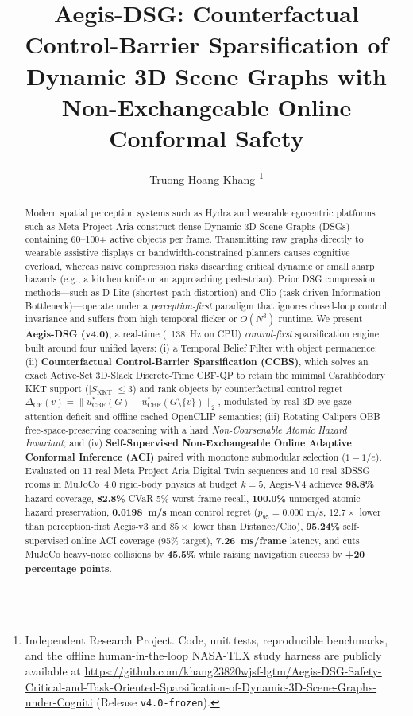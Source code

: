 \documentclass[journal]{IEEEtran}
\title{Aegis-DSG: Counterfactual Control-Barrier Sparsification of Dynamic 3D Scene Graphs with Non-Exchangeable Online Conformal Safety}
\author{Truong Hoang Khang%
\thanks{Independent Research Project. Code, unit tests, reproducible benchmarks, and the offline human-in-the-loop NASA-TLX study harness are publicly available at \url{https://github.com/khang23820wjsf-lgtm/Aegis-DSG-Safety-Critical-and-Task-Oriented-Sparsification-of-Dynamic-3D-Scene-Graphs-under-Cogniti} (Release \texttt{v4.0-frozen}).}}
\begin{document}
\maketitle

\begin{abstract}
Modern spatial perception systems such as Hydra and wearable egocentric platforms such as Meta Project Aria construct dense Dynamic 3D Scene Graphs (DSGs) containing 60--100+ active objects per frame. Transmitting raw graphs directly to wearable assistive displays or bandwidth-constrained planners causes cognitive overload, whereas naive compression risks discarding critical dynamic or small sharp hazards (e.g., a kitchen knife or an approaching pedestrian). Prior DSG compression methods---such as D-Lite (shortest-path distortion) and Clio (task-driven Information Bottleneck)---operate under a \emph{perception-first} paradigm that ignores closed-loop control invariance and suffers from high temporal flicker or $O(N^3)$ runtime. We present \textbf{Aegis-DSG (v4.0)}, a real-time (~138~Hz on CPU) \emph{control-first} sparsification engine built around four unified layers: (i) a Temporal Belief Filter with object permanence; (ii) \textbf{Counterfactual Control-Barrier Sparsification (CCBS)}, which solves an exact Active-Set 3D-Slack Discrete-Time CBF-QP to retain the minimal Carath\'eodory KKT support ($|S_{\text{KKT}}| \le 3$) and rank objects by counterfactual control regret $\Delta_{\text{CF}}(v) = \|u^*_{\text{CBF}}(G) - u^*_{\text{CBF}}(G \setminus \{v\})\|_2$, modulated by real 3D eye-gaze attention deficit and offline-cached OpenCLIP semantics; (iii) Rotating-Calipers OBB free-space-preserving coarsening with a hard \emph{Non-Coarsenable Atomic Hazard Invariant}; and (iv) \textbf{Self-Supervised Non-Exchangeable Online Adaptive Conformal Inference (ACI)} paired with monotone submodular selection ($1 - 1/e$). Evaluated on 11 real Meta Project Aria Digital Twin sequences and 10 real 3DSSG rooms in MuJoCo~4.0 rigid-body physics at budget $k = 5$, Aegis-V4 achieves \textbf{98.8\%} hazard coverage, \textbf{82.8\%} CVaR-5\% worst-frame recall, \textbf{100.0\%} unmerged atomic hazard preservation, \textbf{0.0198~m/s} mean control regret ($p_{95} = 0.000\text{ m/s}$, $12.7\times$ lower than perception-first Aegis-v3 and $85\times$ lower than Distance/Clio), \textbf{95.24\%} self-supervised online ACI coverage (95\% target), \textbf{7.26~ms/frame} latency, and cuts MuJoCo heavy-noise collisions by \textbf{45.5\%} while raising navigation success by \textbf{+20 percentage points}.
\end{abstract}
\end{document}
